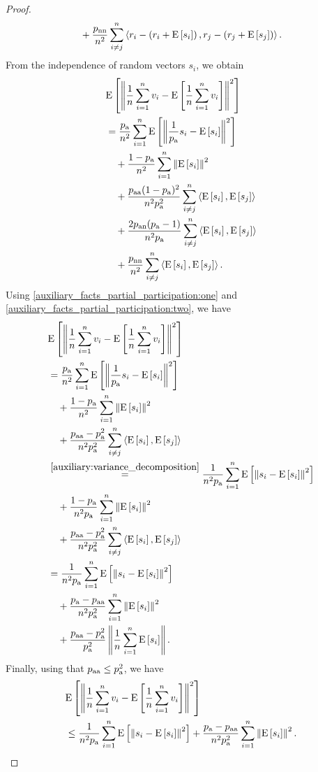 \documentclass{article}
\newcommand*{\probavailable}{\ensuremath{p_{\textnormal{a}}}}
\newcommand*{\probpairaa}{\ensuremath{p_{\textnormal{aa}}}}
\newcommand*{\probpairan}{\ensuremath{p_{\textnormal{an}}}}
\newcommand*{\probpairnn}{\ensuremath{p_{\textnormal{nn}}}}
\begin{document}
\begin{proof}
\begin{align*}
    &\quad +\frac{\probpairnn}{n^2}\sum_{i\neq j}^n\inp{r_i - \left(r_i + \Exp{s_i}\right)}{r_j - \left(r_j + \Exp{s_j}\right)}.
  \end{align*}
  From the independence of random vectors $s_i$, we obtain
  \begin{align*}
    &\Exp{\norm{\frac{1}{n}\sum_{i=1}^n v_i - \Exp{\frac{1}{n}\sum_{i=1}^n v_i}}^2} \\
    &=\frac{\probavailable}{n^2}\sum_{i=1}^n\Exp{\norm{\frac{1}{\probavailable} s_i - \Exp{s_i}}^2} \\
    &\quad +\frac{1 - \probavailable}{n^2}\sum_{i=1}^n\norm{\Exp{s_i}}^2 \\
    &\quad +\frac{\probpairaa (1 - \probavailable)^2}{n^2 \probavailable^2}\sum_{i\neq j}^n\inp{\Exp{s_i}}{\Exp{s_j}} \\
    &\quad +\frac{2 \probpairan (\probavailable - 1)}{n^2 \probavailable}\sum_{i\neq j}^n\inp{\Exp{s_i}}{\Exp{s_j}} \\
    &\quad +\frac{\probpairnn}{n^2}\sum_{i\neq j}^n\inp{\Exp{s_i}}{\Exp{s_j}}.
  \end{align*}
  Using \eqref{auxiliary_facts_partial_participation:one} and \eqref{auxiliary_facts_partial_participation:two}, we have
  \begin{align*}
    &\Exp{\norm{\frac{1}{n}\sum_{i=1}^n v_i - \Exp{\frac{1}{n}\sum_{i=1}^n v_i}}^2} \\
    &=\frac{\probavailable}{n^2}\sum_{i=1}^n\Exp{\norm{\frac{1}{\probavailable} s_i - \Exp{s_i}}^2} \\
    &\quad +\frac{1 - \probavailable}{n^2}\sum_{i=1}^n\norm{\Exp{s_i}}^2 \\
    &\quad +\frac{\probpairaa - \probavailable^2}{n^2 \probavailable^2}\sum_{i\neq j}^n\inp{\Exp{s_i}}{\Exp{s_j}} \\
    &\overset{\eqref{auxiliary:variance_decomposition}}{=}\frac{1}{n^2 \probavailable}\sum_{i=1}^n\Exp{\norm{s_i - \Exp{s_i}}^2} \\
    &\quad +\frac{1 - \probavailable}{n^2 \probavailable}\sum_{i=1}^n\norm{\Exp{s_i}}^2 \\
    &\quad +\frac{\probpairaa - \probavailable^2}{n^2 \probavailable^2}\sum_{i\neq j}^n\inp{\Exp{s_i}}{\Exp{s_j}} \\
    &=\frac{1}{n^2 \probavailable}\sum_{i=1}^n\Exp{\norm{s_i - \Exp{s_i}}^2} \\
    &\quad +\frac{\probavailable - \probpairaa}{n^2 \probavailable^2}\sum_{i=1}^n\norm{\Exp{s_i}}^2 \\
    &\quad +\frac{\probpairaa - \probavailable^2}{\probavailable^2}\norm{\frac{1}{n}\sum_{i=1}^n\Exp{s_i}}.
  \end{align*}
  Finally, using that $\probpairaa \leq \probavailable^2$, we have
  \begin{align*}
    &\Exp{\norm{\frac{1}{n}\sum_{i=1}^n v_i - \Exp{\frac{1}{n}\sum_{i=1}^n v_i}}^2} \\
    &\leq\frac{1}{n^2 \probavailable}\sum_{i=1}^n\Exp{\norm{s_i - \Exp{s_i}}^2} +\frac{\probavailable - \probpairaa}{n^2 \probavailable^2}\sum_{i=1}^n\norm{\Exp{s_i}}^2.
  \end{align*}
\end{proof}
\end{document}
